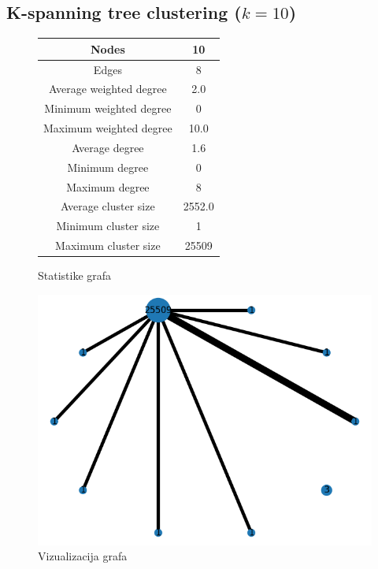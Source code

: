 \documentclass[a4paper,12pt]{article}
\begin{document}
	\subsection{K-spanning tree clustering ($k = 10$)}
	\begin{figure}[H]
		\centering
		\begin{tabular}{ |c|c| } 
			\hline
			Nodes& 10 \\
			\hline
			Edges& 8 \\
			\hline
			Average weighted degree& 2.0 \\
			Minimum weighted degree& 0  \\
			Maximum weighted degree& 10.0 \\
			\hline
			Average degree& 1.6 \\
			Minimum degree& 0 \\ 
			Maximum degree& 8 \\
			\hline
			Average cluster size& 2552.0 \\
			Minimum cluster size& 1 \\
			Maximum cluster size& 25509 \\
			\hline
			
		\end{tabular}
		\caption{Statistike grafa}
	\end{figure}
	
	\begin{figure}[H]
		\centering
		\includegraphics[scale=0.7]{spanning_merged_graph_10_visualization}
		\caption{Vizualizacija grafa}
	\end{figure}
\end{document}
